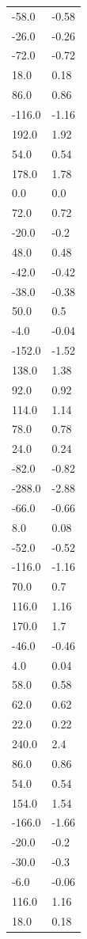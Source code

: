 \begin{longtable}{ll}
-58.0 & -0.58 \\
-26.0 & -0.26 \\
-72.0 & -0.72 \\
18.0 & 0.18 \\
86.0 & 0.86 \\
-116.0 & -1.16 \\
192.0 & 1.92 \\
54.0 & 0.54 \\
178.0 & 1.78 \\
0.0 & 0.0 \\
72.0 & 0.72 \\
-20.0 & -0.2 \\
48.0 & 0.48 \\
-42.0 & -0.42 \\
-38.0 & -0.38 \\
50.0 & 0.5 \\
-4.0 & -0.04 \\
-152.0 & -1.52 \\
138.0 & 1.38 \\
92.0 & 0.92 \\
114.0 & 1.14 \\
78.0 & 0.78 \\
24.0 & 0.24 \\
-82.0 & -0.82 \\
-288.0 & -2.88 \\
-66.0 & -0.66 \\
8.0 & 0.08 \\
-52.0 & -0.52 \\
-116.0 & -1.16 \\
70.0 & 0.7 \\
116.0 & 1.16 \\
170.0 & 1.7 \\
-46.0 & -0.46 \\
4.0 & 0.04 \\
58.0 & 0.58 \\
62.0 & 0.62 \\
22.0 & 0.22 \\
240.0 & 2.4 \\
86.0 & 0.86 \\
54.0 & 0.54 \\
154.0 & 1.54 \\
-166.0 & -1.66 \\
-20.0 & -0.2 \\
-30.0 & -0.3 \\
-6.0 & -0.06 \\
116.0 & 1.16 \\
18.0 & 0.18 \\

\end{longtable}
